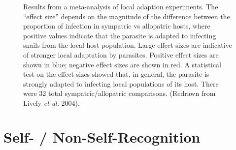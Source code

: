 \documentclass[
  letterpaper,
]{book}
\begin{document}
\begin{figure}


\caption[Results from a meta-analysis of local adaption
experiments]{\label{fig-4.5}Results from a meta-analysis of local
adaption experiments. The ``effect size'' depends on the magnitude of
the difference between the proportion of infection in sympatric vs
allopatric hosts, where positive values indicate that the parasite is
adapted to infecting snails from the local host population. Large effect
sizes are indicative of stronger local adaptation by parasites. Positive
effect sizes are shown in blue; negative effect sizes are shown in red.
A statistical test on the effect sizes showed that, in general, the
parasite is strongly adapted to infecting local populations of its host.
There were 32 total sympatric/allopatric comparisons. (Redrawn from
Lively \emph{et al.} 2004).}

\end{figure}%

\section{Self- / Non-Self-Recognition}\label{self--non-self-recognition}
\end{document}
